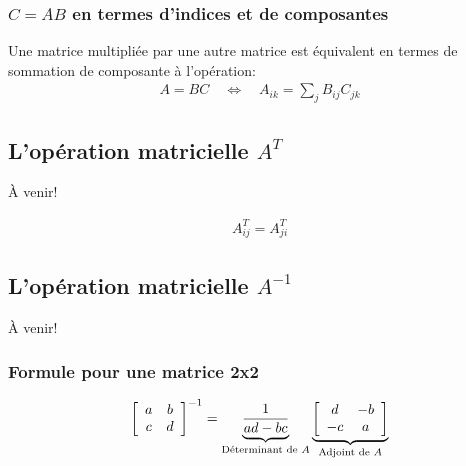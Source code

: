 \subsubsection{$C = A B $ en termes d'indices et de composantes}
Une matrice multipliée par une autre matrice est équivalent en termes de sommation de composante à l'opération:
\begin{align}
A  = B C
\quad \Leftrightarrow \quad
A_{ik} = \sum_j{B_{ij} C_{jk} }
\end{align}



\subsection{L'opération matricielle $A^T$}

À venir!

\begin{align}
A^{T}_{ij} = A^{T}_{ji}
\end{align}

\subsection{L'opération matricielle $A^{-1}$}

À venir!

\subsubsection{Formule pour une matrice 2x2}
\begin{align}
\left[ \begin{array}{c c } 
a      &   b   \\ 
c      &   d 
\end{array} \right]^{-1}
=
\underbrace{
\frac{1}{ad-bc}
}_{\text{Déterminant de $A$}}
\underbrace{
\left[ \begin{array}{c c } 
d      &   -b   \\ 
-c     &    a 
\end{array} \right]
}_{\text{Adjoint de $A$}}
\end{align}


